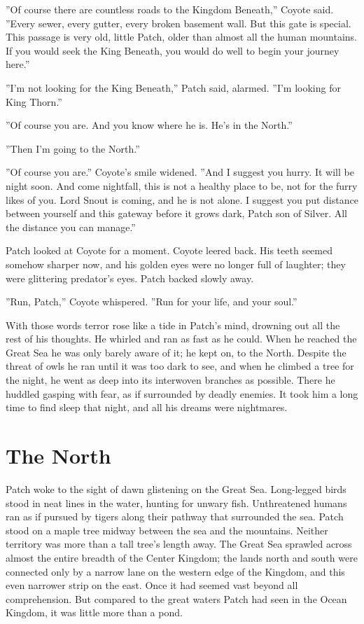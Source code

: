 \documentclass[12pt]{book}
\begin{document}
''Of course there are countless roads to the Kingdom Beneath,'' Coyote
said. ''Every sewer, every gutter, every broken basement wall. But
this gate is special. This passage is very old, little Patch, older
than almost all the human mountains. If you would seek the King
Beneath, you would do well to begin your journey here.''

''I'm not looking for the King Beneath,'' Patch said, alarmed. ''I'm
looking for King Thorn.''

''Of course you are. And you know where he is. He's in the North.''

''Then I'm going to the North.''

''Of course you are.'' Coyote's smile widened. ''And I suggest you
hurry. It will be night soon. And come nightfall, this is not a
healthy place to be, not for the furry likes of you. Lord Snout is
coming, and he is not alone. I suggest you put distance between
yourself and this gateway before it grows dark, Patch son of
Silver. All the distance you can manage.''

Patch looked at Coyote for a moment. Coyote leered back. His teeth
seemed somehow sharper now, and his golden eyes were no longer full of
laughter; they were glittering predator's eyes. Patch backed slowly
away.

''Run, Patch,'' Coyote whispered. ''Run for your life, and your
soul.''

With those words terror rose like a tide in Patch's mind, drowning out
all the rest of his thoughts. He whirled and ran as fast as he
could. When he reached the Great Sea he was only barely aware of it;
he kept on, to the North. Despite the threat of owls he ran until it
was too dark to see, and when he climbed a tree for the night, he went
as deep into its interwoven branches as possible. There he huddled
gasping with fear, as if surrounded by deadly enemies. It took him a
long time to find sleep that night, and all his dreams were
nightmares.


\section{The North}

Patch woke to the sight of dawn glistening on the Great
Sea. Long-legged birds stood in neat lines in the water, hunting for
unwary fish. Unthreatened humans ran as if pursued by tigers along
their pathway that surrounded the sea. Patch stood on a maple tree
midway between the sea and the mountains. Neither territory was more
than a tall tree's length away. The Great Sea sprawled across almost
the entire breadth of the Center Kingdom; the lands north and south
were connected only by a narrow lane on the western edge of the
Kingdom, and this even narrower strip on the east. Once it had seemed
vast beyond all comprehension. But compared to the great waters Patch
had seen in the Ocean Kingdom, it was little more than a pond.
\end{document}

